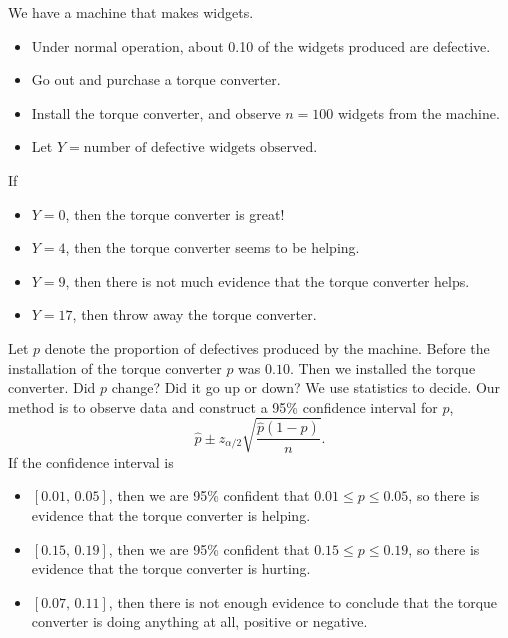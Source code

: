 \documentclass[captions=tableheading]{scrbook}
\begin{document}
\begin{example}

We have a machine that makes widgets. 

\begin{itemize}
\item Under normal operation, about 0.10 of the widgets produced are defective.
\item Go out and purchase a torque converter.
\item Install the torque converter, and observe \(n=100\) widgets from the machine.
\item Let \(Y=\mbox{number of defective widgets observed}\).
\end{itemize}

If

\begin{itemize}
\item \(Y=0\), then the torque converter is great!
\item \(Y=4\), then the torque converter seems to be helping.
\item \(Y=9\), then there is not much evidence that the torque converter helps.
\item \(Y=17\), then throw away the torque converter.
\end{itemize}

Let \(p\) denote the proportion of defectives produced by the machine. Before the installation of the torque converter \(p\) was \(0.10\). Then we installed the torque converter. Did \(p\) change? Did it go up or down? We use statistics to decide. Our method is to observe data and construct a 95\% confidence interval for \(p\),
\begin{equation}
\hat{p}\pm z_{\alpha/2}\sqrt{\frac{\hat{p}(1-\hat{p})}{n}}.
\end{equation}
If the confidence interval is 
\begin{itemize}
\item \([0.01,\,0.05]\), then we are 95\% confident that \(0.01\leq p\leq0.05\), so there is evidence that the torque converter is helping.
\item \([0.15,\,0.19]\), then we are 95\% confident that \(0.15\leq p\leq0.19\), so there is evidence that the torque converter is hurting.
\item \([0.07,\,0.11]\), then there is not enough evidence to conclude that the torque converter is doing anything at all, positive or negative.
\end{itemize}

\end{example}
\end{document}

